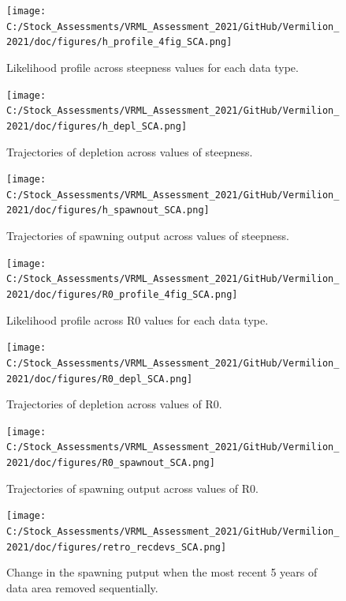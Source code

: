 \documentclass[
  english,
  a4paper,
]{article}
\begin{document}
\begin{figure}
\centering
\texttt{[image: C:/Stock\_Assessments/VRML\_Assessment\_2021/GitHub/Vermilion\_2021/doc/figures/h\_profile\_4fig\_SCA.png]}
\caption{Likelihood profile across steepness values for each data type.\label{fig:h-profile}}
\end{figure}

\begin{figure}
\centering
\texttt{[image: C:/Stock\_Assessments/VRML\_Assessment\_2021/GitHub/Vermilion\_2021/doc/figures/h\_depl\_SCA.png]}
\caption{Trajectories of depletion across values of steepness.\label{fig:h-depl}}
\end{figure}

\begin{figure}
\centering
\texttt{[image: C:/Stock\_Assessments/VRML\_Assessment\_2021/GitHub/Vermilion\_2021/doc/figures/h\_spawnout\_SCA.png]}
\caption{Trajectories of spawning output across values of steepness.\label{fig:h-spawn}}
\end{figure}

\begin{figure}
\centering
\texttt{[image: C:/Stock\_Assessments/VRML\_Assessment\_2021/GitHub/Vermilion\_2021/doc/figures/R0\_profile\_4fig\_SCA.png]}
\caption{Likelihood profile across R0 values for each data type.\label{fig:r0-profile}}
\end{figure}

\begin{figure}
\centering
\texttt{[image: C:/Stock\_Assessments/VRML\_Assessment\_2021/GitHub/Vermilion\_2021/doc/figures/R0\_depl\_SCA.png]}
\caption{Trajectories of depletion across values of R0.\label{fig:r0-depl}}
\end{figure}

\begin{figure}
\centering
\texttt{[image: C:/Stock\_Assessments/VRML\_Assessment\_2021/GitHub/Vermilion\_2021/doc/figures/R0\_spawnout\_SCA.png]}
\caption{Trajectories of spawning output across values of R0.\label{fig:r0-spawn}}
\end{figure}

\begin{figure}
\centering
\texttt{[image: C:/Stock\_Assessments/VRML\_Assessment\_2021/GitHub/Vermilion\_2021/doc/figures/retro\_recdevs\_SCA.png]}
\caption{Change in the spawning putput when the most recent 5 years of data area removed sequentially.\label{fig:retro-spawnb}}
\end{figure}
\end{document}
